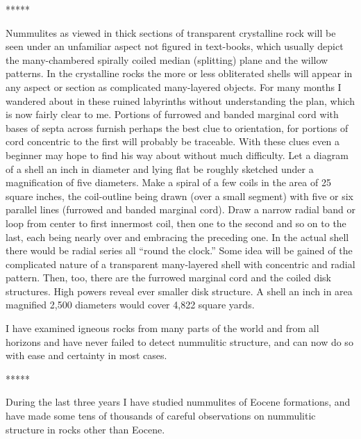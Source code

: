 \documentclass[a4paper, 12pt, oneside]{article}
\begin{document}
\centerline{*\hspace{15mm}*\hspace{15mm}*\hspace{15mm}*\hspace{15mm}*}
\bigskip

Nummulites as viewed in thick sections of transparent crystalline rock will be seen under an unfamiliar aspect not figured in text-books, which usually depict the many-chambered spirally coiled median (splitting) plane and the willow patterns. In the crystalline rocks the more or less obliterated shells will appear in any aspect or section as complicated many-layered objects. For many months I wandered about in these ruined labyrinths without understanding the plan, which is now fairly clear to me. Portions of furrowed and banded marginal cord with bases of septa across furnish perhaps the best clue to orientation, for portions of cord concentric to the first will probably be traceable. With these clues even a beginner may hope to find his way about without much difficulty. Let a diagram of a shell an inch in diameter and lying flat be roughly sketched under a magnification of five diameters. Make a spiral of a few coils in the area of 25 square inches, the coil-outline being drawn (over a small segment) with five or six parallel lines (furrowed and banded marginal cord). Draw a narrow radial band or loop from center to first innermost coil, then one to the second and so on to the last, each being nearly over and embracing the preceding one. In the actual shell there would be radial series all ``round the clock.'' Some idea will be gained of the complicated nature of a transparent many-layered shell with concentric and radial pattern. Then, too, there are the furrowed marginal cord and the coiled disk structures. High powers reveal ever smaller disk structure. A shell an inch in area magnified 2,500 diameters would cover 4,822 square yards.

I have examined igneous rocks from many parts of the world and from all horizons and have never failed to detect nummulitic structure, and can now do so with ease and certainty in most cases.

\centerline{*\hspace{15mm}*\hspace{15mm}*\hspace{15mm}*\hspace{15mm}*}
\bigskip

During the last three years I have studied nummulites of Eocene formations, and have made some tens of thousands of careful observations on nummulitic structure in rocks other than Eocene.
\end{document}
